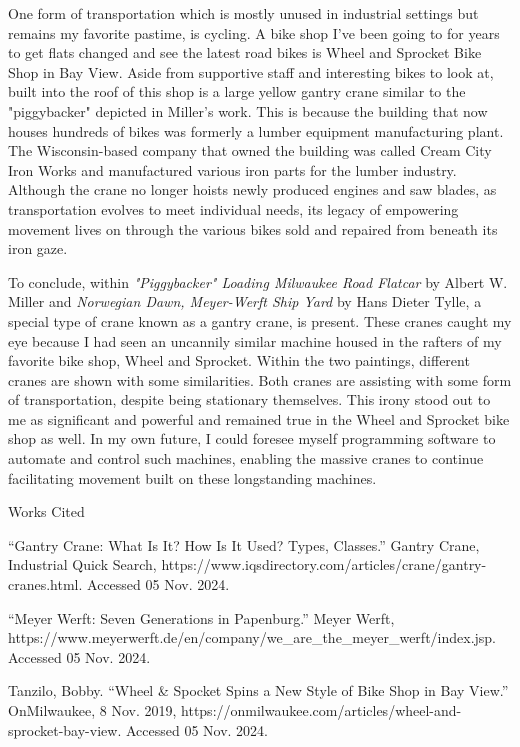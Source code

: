 \documentclass[12pt]{article}
\begin{document}
One form of transportation which is mostly unused in industrial settings but remains my favorite pastime, is cycling. A bike shop I've been going to for
years to get flats changed and see the latest road bikes is Wheel and Sprocket Bike Shop in Bay View. Aside from supportive staff and interesting bikes to look at,
built into the roof of this shop is a large yellow
gantry crane similar to the "piggybacker" depicted in Miller's work. This is because the building that now houses
hundreds of bikes was formerly a lumber equipment manufacturing plant. The Wisconsin-based company that owned the building was called Cream City Iron Works and 
manufactured various iron parts for the lumber industry. Although the crane no longer hoists newly produced engines and saw blades, as transportation
evolves to meet individual needs, its legacy of empowering
movement lives on through the various bikes sold and repaired from beneath its iron gaze. 

To conclude, within \textit{"Piggybacker" Loading Milwaukee Road Flatcar} by Albert W. Miller and \textit{Norwegian Dawn, Meyer-Werft Ship Yard} by 
Hans Dieter Tylle, a special type of crane known as a gantry crane, is present. These cranes caught my eye because I had seen an uncannily similar machine housed
in the rafters of my favorite bike shop, Wheel and Sprocket. Within the two paintings, different cranes are shown with some similarities. Both cranes are
assisting with some form of transportation, despite being stationary themselves. This irony stood out to me as significant and powerful and remained true
in the Wheel and Sprocket bike shop as well. In my own future, I could foresee myself programming software to automate and control such machines, enabling the
massive cranes to continue facilitating movement built on these longstanding machines.

\newpage

\begin{center}
Works Cited
\end{center}

\begin{hangparas}{0.5in}{1}

“Gantry Crane: What Is It? How Is It Used? Types, Classes.” Gantry Crane, Industrial Quick Search,
https://www.iqsdirectory.com/articles/crane/gantry-cranes.html. Accessed 05 Nov. 2024. 

“Meyer Werft: Seven Generations in Papenburg.” Meyer Werft,\\
    https://www.meyerwerft.de/en/company/we\_are\_the\_meyer\_werft/index.jsp. Accessed 05 Nov. 2024. 

Tanzilo, Bobby. “Wheel \& Spocket Spins a New Style of Bike Shop in Bay View.”
OnMilwaukee, 8 Nov. 2019, https://onmilwaukee.com/articles/wheel-and-sprocket-bay-view. Accessed 05 Nov. 2024.

\end{hangparas}
\end{document}
